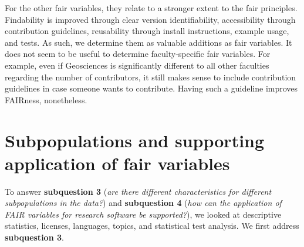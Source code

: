 For the other \acrshort{fair} variables, they relate to a stronger extent to the \acrshort{fair} principles. Findability is improved through clear version identifiability, accessibility through contribution guidelines, reusability through install instructions, example usage, and tests. As such, we determine them as valuable additions as \acrshort{fair} variables. It does not seem to be useful to determine faculty-specific \acrshort{fair} variables. For example, even if Geosciences is significantly different to all other faculties regarding the number of contributors, it still makes sense to include contribution guidelines in case someone wants to contribute. Having such a guideline improves FAIRness, nonetheless.


\section{Subpopulations and supporting application of \acrshort{fair} variables}
\label{sec:disc:sq3_sq4}

To answer \textbf{subquestion 3} (\textit{are there different characteristics for different subpopulations in the data?}) and \textbf{subquestion 4} (\textit{how can the application of FAIR variables for research software be supported?}), we looked at descriptive statistics, licenses, languages, topics, and statistical test analysis. We first address \textbf{subquestion 3}. 



